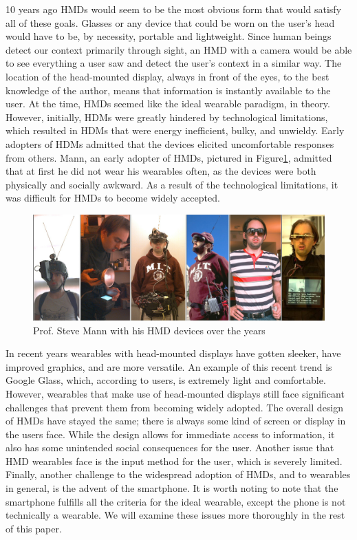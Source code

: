 \documentclass[11pt]{article}
\begin{document}
10 years ago HMDs would seem to be the most obvious form that would satisfy all of these goals. Glasses or any device that could be worn on the user's head would have to be, by necessity, portable and lightweight. Since human beings detect our context primarily through sight, an HMD with a camera would be able to see everything a user saw and detect the user's context in a similar way. The location of the head-mounted display, always in front of the eyes, to the best knowledge of the author, means that information is instantly available to the user. At the time, HMDs seemed like the ideal wearable paradigm, in theory. However, initially, HDMs were greatly hindered by technological limitations, which resulted in HDMs that were energy inefficient, bulky, and unwieldy\cite{fromCyborgsToGG}. Early adopters of HDMs admitted that the devices elicited uncomfortable responses from others. Mann, an early adopter of HMDs, pictured in Figure\ref{fig:Mann}, admitted that at first he did not wear his wearables often, as the devices were both physically and socially awkward\cite{smartClothingShift}.  As a result of the technological limitations, it was difficult for HMDs to become widely accepted.  

\begin{figure}[H] %
   \centering
   \includegraphics[width=5in]{Wearcompevolution2.jpg}       
   \caption{Prof. Steve Mann with his HMD devices over the years \cite{wearablesOverTime}}
   \label{fig:Mann}
\end{figure} 

In recent years wearables with head-mounted displays have gotten sleeker, have improved graphics, and are more versatile. An example of this recent trend is Google Glass, which, according to users, is extremely light and comfortable. However, wearables that make use of head-mounted displays still face significant challenges that prevent them from becoming widely adopted. The overall design of HMDs have stayed the same; there is always some kind of screen or display in the users face. While the design allows for immediate access to information, it also has some unintended social consequences for the user. Another issue that HMD wearables face is the input method for the user, which is severely limited. Finally, another challenge to the widespread adoption of HMDs, and to wearables in general, is the advent of the smartphone. It is worth noting to note that the smartphone fulfills all the criteria for the ideal wearable, except the phone is not technically a wearable. We will examine these issues more thoroughly in the rest of this paper.
\end{document}
